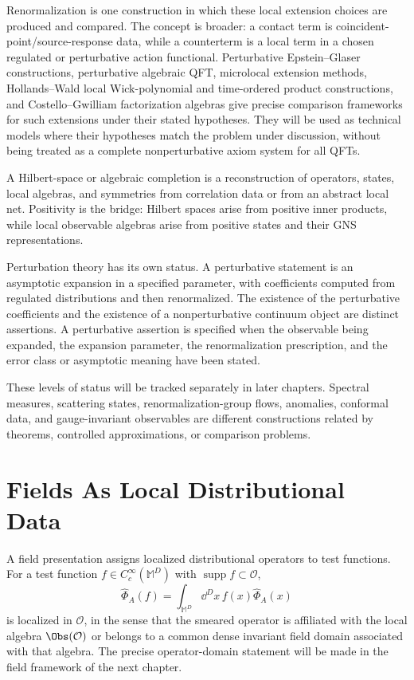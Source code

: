 Renormalization is one construction in which these local extension choices
are produced and compared.  The concept is broader: a contact term is
coincident-point/source-response data, while a counterterm is a local term in
a chosen regulated or perturbative action functional.  Perturbative
Epstein--Glaser constructions, perturbative algebraic QFT, microlocal
extension methods, Hollands--Wald local Wick-polynomial and time-ordered
product constructions, and Costello--Gwilliam factorization algebras give
precise comparison frameworks for such extensions under their stated
hypotheses.  They will be used as technical models where their hypotheses
match the problem under discussion, without being treated as a complete
nonperturbative axiom system for all QFTs.

\begin{definition}
\label{def:hilbert-algebraic-completion-opening}
  A Hilbert-space or algebraic completion is a reconstruction of operators,
  states, local algebras, and symmetries from correlation data or from an
  abstract local net.  Positivity is the bridge: Hilbert spaces arise from
  positive inner products, while local observable algebras arise from
  positive states and their GNS representations.
\end{definition}

Perturbation theory has its own status.  A perturbative statement is an
asymptotic expansion in a specified parameter, with coefficients computed from
regulated distributions and then renormalized.  The existence of the
perturbative coefficients and the existence of a nonperturbative continuum
object are distinct assertions.  A perturbative assertion is specified when
the observable being expanded, the expansion parameter, the renormalization
prescription, and the error class or asymptotic meaning have been stated.

These levels of status will be tracked separately in later chapters.  Spectral
measures, scattering states, renormalization-group flows, anomalies,
conformal data, and gauge-invariant observables are different constructions
related by theorems, controlled approximations, or comparison problems.

\section{Fields As Local Distributional Data}

A field presentation assigns localized distributional operators to test
functions. For a test function \(f\in C_c^\infty(\mathbb M^D)\) with
\(\operatorname{supp}f\subset\mathcal O\),
\[
  \widehat\Phi_A(f)
  =
  \int_{\mathbb M^D}\dd^Dx\,f(x)\widehat\Phi_A(x)
\]
is localized in \(\mathcal O\), in the sense that the smeared operator is
affiliated with the local algebra \(\Obs(\mathcal O)\) or belongs to a common
dense invariant field domain associated with that algebra. The precise
operator-domain statement will be made in the field framework of the next
chapter.

